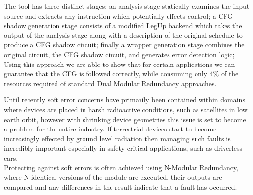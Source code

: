 The tool has three distinct stages: an analysis stage statically examines the input source and extracts any instruction
which potentially effects control; a CFG shadow generation stage consists of a modified LegUp backend
which takes the output of the analysis stage along with a description of the original schedule to produce a CFG shadow circuit;
finally a wrapper generation stage combines the original circuit, the CFG shadow circuit, and generates error detection logic;
Using this approach we are able to show that for certain applications we can guarantee that the CFG
is followed correctly, while consuming only 4\% of the resources required of standard Dual Modular Redundancy approaches.

Until recently soft error concerns have primarily been contained within domains where
devices are placed in harsh radioactive conditions, such as satellites in low earth orbit, however
with shrinking device geometries this issue is set to become a problem for the entire
industry\cite{ibe2010impact}.
If terrestrial devices start to become increasingly effected by ground level radiation
then managing such faults is incredibly important especially in safety critical applications, such
as driverless cars.\\

Protecting against soft errors is often achieved using N-Modular Redundancy, where N identical
versions of the module are executed, their outputs are compared and any differences in the
result indicate that a fault has occurred.





